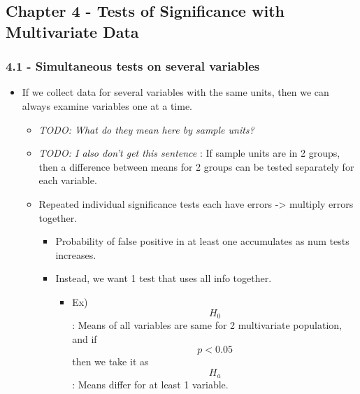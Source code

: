 \documentclass[]{article}
\providecommand{\tightlist}{%
  \setlength{\itemsep}{0pt}\setlength{\parskip}{0pt}}
\begin{document}
\hypertarget{chapter-4---tests-of-significance-with-multivariate-data}{%
\subsection{Chapter 4 - Tests of Significance with Multivariate
Data}\label{chapter-4---tests-of-significance-with-multivariate-data}}

\hypertarget{simultaneous-tests-on-several-variables}{%
\subsubsection{4.1 - Simultaneous tests on several
variables}\label{simultaneous-tests-on-several-variables}}

\begin{itemize}
\tightlist
\item
  If we collect data for several variables with the same units, then we
  can always examine variables one at a time.

  \begin{itemize}
  \tightlist
  \item
    \emph{TODO: What do they mean here by sample units?}
  \item
    \emph{TODO: I also don't get this sentence} : If sample units are in
    2 groups, then a difference between means for 2 groups can be tested
    separately for each variable.
  \item
    Repeated individual significance tests each have errors
    -\textgreater{} multiply errors together.

    \begin{itemize}
    \tightlist
    \item
      Probability of false positive in at least one accumulates as num
      tests increases.
    \item
      Instead, we want 1 test that uses all info together.

      \begin{itemize}
      \tightlist
      \item
        Ex) \[H_0\]: Means of all variables are same for 2 multivariate
        population, and if \[p < 0.05\] then we take it as \[H_a\]:
        Means differ for at least 1 variable.
      \end{itemize}
    \end{itemize}
  \end{itemize}
\end{itemize}
\end{document}
